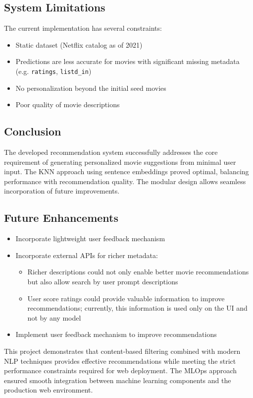 \documentclass{article}
\begin{document}
\subsection*{System Limitations}
The current implementation has several constraints:
\begin{itemize}
    \item Static dataset (Netflix catalog as of 2021)
    \item Predictions are less accurate for movies with significant missing metadata (e.g. \verb |ratings|, \verb|listd_in|)
    \item No personalization beyond the initial seed movies
    \item Poor quality of movie descriptions
\end{itemize}


\subsection*{Conclusion}
The developed recommendation system successfully addresses the core requirement of generating personalized movie suggestions from minimal user input. The KNN approach using sentence embeddings proved optimal, balancing performance with recommendation quality. The modular design allows seamless incorporation of future improvements.



\subsection*{Future Enhancements}
\begin{itemize}
    \item Incorporate lightweight user feedback mechanism
    \item Incorporate external APIs for richer metadata:
    \begin{itemize}
        \item Richer descriptions could not only enable better movie recommendations but also allow search by user prompt descriptions
        \item User score ratings could provide valuable information to improve recommendations; currently, this information is used only on the UI and not by any model
    \end{itemize}
    \item Implement user feedback mechanism to improve recommendations
\end{itemize}

This project demonstrates that content-based filtering combined with modern NLP techniques provides effective recommendations while meeting the strict performance constraints required for web deployment. The MLOps approach ensured smooth integration between machine learning components and the production web environment.
\end{document}
